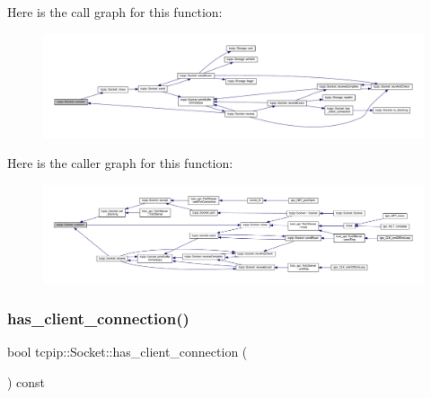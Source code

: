Here is the call graph for this function\+:\nopagebreak
\begin{figure}[H]
\begin{center}
\leavevmode
\includegraphics[width=350pt]{classtcpip_1_1_socket_a8f89d187776729d15db3ba5c99c36acd_cgraph}
\end{center}
\end{figure}
Here is the caller graph for this function\+:\nopagebreak
\begin{figure}[H]
\begin{center}
\leavevmode
\includegraphics[width=350pt]{classtcpip_1_1_socket_a8f89d187776729d15db3ba5c99c36acd_icgraph}
\end{center}
\end{figure}
\mbox{\label{classtcpip_1_1_socket_a78436cfed4ad686180491c38e88ebfc3}} 
\subsubsection{\texorpdfstring{has\+\_\+client\+\_\+connection()}{has\_client\_connection()}}
{\footnotesize\ttfamily bool tcpip\+::\+Socket\+::has\+\_\+client\+\_\+connection (\begin{DoxyParamCaption}{ }\end{DoxyParamCaption}) const}


